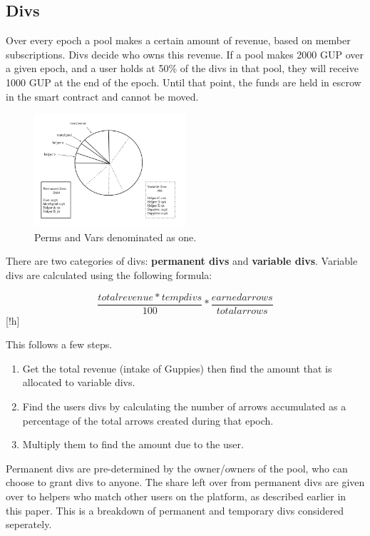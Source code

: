 \documentclass[a4paper]{article}
\begin{document}
\subsection{Divs}
Over every epoch a pool makes a certain amount of revenue, based on member subscriptions. Divs decide who owns this revenue. If a pool makes 2000 GUP over a given epoch, and a user holds at 50\% of the divs in that pool, they will receive 1000 GUP at the end of the epoch. Until that point, the funds are held in escrow in the smart contract and cannot be moved.

\begin{figure}[!ht]
\centering
\includegraphics[width=0.5\textwidth]{divs.png}
\caption{\label{fig:Matchmakers} Perms and Vars denominated as one.}
\end{figure}

There are two categories of divs: \textbf{permanent divs} and \textbf{variable divs}. Variable divs are calculated using the following formula:

\[\frac{totalrevenue * tempdivs}{100} * \frac{earnedarrows}{totalarrows} \][!h]

This follows a few steps.
\begin{enumerate}
\item
Get the total revenue (intake of Guppies) then find the amount that is allocated to variable divs.
\item
Find the users divs by calculating the number of arrows accumulated as a percentage of the total arrows created during that epoch.
\item
Multiply them to find the amount due to the user.
\end{enumerate}
Permanent divs are pre-determined by the owner/owners of the pool, who can choose to grant divs to anyone. The share left over from permanent divs are given over to helpers who match other users on the platform, as described earlier in this paper. This is a breakdown of permanent and temporary divs considered seperately.
\end{document}
